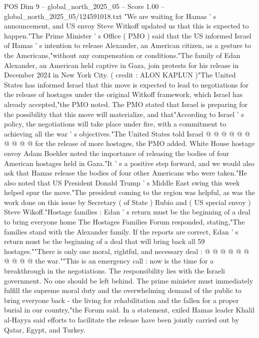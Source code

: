 \begin{textsample}{POS Dim 9 – global\_north\_2025\_05 – Score 1.00 – global\_north\_2025\_05/124591018.txt}  \label{ex:f9_pos_367}
"We are waiting for Hamas ' s announcement, and US envoy Steve Witkoff updated us that this is expected to happen."The Prime Minister ' s Office ( PMO ) said that the US informed Israel of Hamas ' s intention to release Alexander, an American citizen, as a gesture to the Americans,"without any compensation or conditions."The family of Edan Alexander, an American held captive in Gaza, join protests for his release in December 2024 in New York City. ( credit : ALON KAPLUN )"The United States has informed Israel that this move is expected to lead to negotiations for the release of hostages under the original Witkoff framework, which Israel has already accepted,"the PMO noted.
The PMO stated that Israel is preparing for the possibility that this move will materialize, and that"According to Israel ' s policy, the negotiations will take place under fire, with a commitment to achieving all the war ' s objectives."The United States told Israel @ @ @ @ @ @ @ @ @ @ for the release of more hostages, the PMO added.
White House hostage envoy Adam Boehler noted the importance of releasing the bodies of four American hostages held in Gaza."It ' s a positive step forward, and we would also ask that Hamas release the bodies of four other Americans who were taken."He also noted that US President Donald Trump ' s Middle East swing this week helped spur the move."The president coming to the region was helpful, as was the work done on this issue by Secretary ( of State ) Rubio and ( US special envoy ) Steve Wikoff."Hostage families : Edan ' s return must be the beginning of a deal to bring everyone home The Hostages Families Forum responded, stating,"The families stand with the Alexander family.
If the reports are correct, Edan ' s return must be the beginning of a deal that will bring back all 59 hostages.""There is only one moral, rightful, and necessary deal : @ @ @ @ @ @ @ @ @ @ the war.""This is an emergency call : now is the time for a breakthrough in the negotiations.
The responsibility lies with the Israeli government.
No one should be left behind.
The prime minister must immediately fulfill the supreme moral duty and the overwhelming demand of the public to bring everyone back - the living for rehabilitation and the fallen for a proper burial in our country,"the Forum said.
In a statement, exiled Hamas leader Khalil al-Hayya said efforts to facilitate the release have been jointly carried out by Qatar, Egypt, and Turkey.

\end{textsample}
